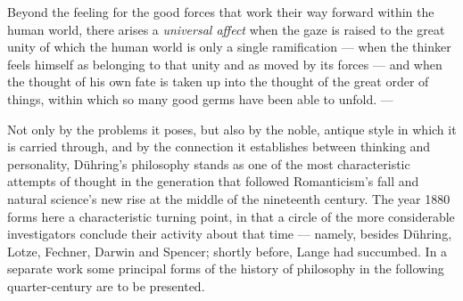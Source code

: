 \documentclass[12pt,a4paper]{book}
\begin{document}
Beyond the feeling for the good forces that work their way forward within the
human world, there arises a \emph{universal affect} when the gaze is raised to
the great unity of which the human world is only a single ramification --- when
the thinker feels himself as belonging to that unity and as moved by its forces
--- and when the thought of his own fate is taken up into the thought of the
great order of things, within which so many good germs have been able to unfold.
---

Not only by the problems it poses, but also by the noble, antique style in which
it is carried through, and by the connection it establishes between thinking and
personality, Dühring's philosophy stands as one of the most characteristic
attempts of thought in the generation that followed Romanticism's fall and
natural science's new rise at the middle of the nineteenth century. The year 1880
forms here a characteristic turning point, in that a circle of the more
considerable investigators conclude their activity about that time --- namely,
besides Dühring, Lotze, Fechner, Darwin and Spencer; shortly before, Lange had
succumbed. In a separate work some principal forms of the history of philosophy
in the following quarter-century are to be presented.
\end{document}

